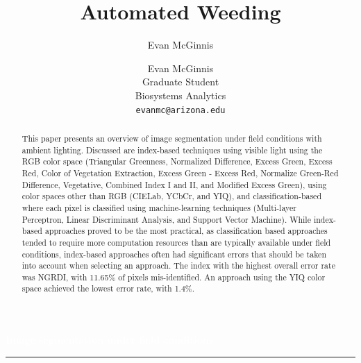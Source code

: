 \documentclass[letterpaper]{article}
\author{Evan McGinnis}
\title{Automated Weeding}
\author{%
    Evan McGinnis \\
    Graduate Student \\
    Biosystems Analytics \\
    \texttt{evanmc@arizona.edu}\vspace{40pt} \\
    }
\makeatletter
\def\printauthor{%
    {\large \@author}}
\makeatother
\begin{document}
\begin{titlepage}
\BgThispage
{}
\vspace*{1cm}
\noindent
\textcolor{white}{\Huge\textbf{\textsf{Image segmentation under field conditions}}}
\vspace*{3.5cm}\par
\noindent
\begin{minipage}{0.35\linewidth}
    \begin{flushright}
        \printauthor
    \end{flushright}
\end{minipage} \hspace{15pt}
%
\begin{minipage}{0.02\linewidth}
    \rule{1pt}{175pt}
\end{minipage} \hspace{-10pt}
%
\begin{minipage}{0.70\linewidth}
\vspace{5pt}
    \begin{abstract} 
This paper presents an overview of image segmentation under field conditions with ambient lighting. Discussed are index-based techniques using visible light using the RGB color space (Triangular Greenness, Normalized Difference, Excess Green, Excess Red, Color of Vegetation Extraction, Excess Green - Excess Red, Normalize Green-Red Difference, Vegetative, Combined Index I and II, and Modified Excess Green), using color spaces other than RGB (CIELab, YCbCr, and YIQ), and classification-based where each pixel is classified using machine-learning techniques (Multi-layer Perceptron, Linear Discriminant Analysis, and Support Vector Machine). While index-based approaches proved to be the most practical, as classification based approaches tended to require more computation resources than are typically available under field conditions, index-based approaches often had significant errors that should be taken into account when selecting an approach. The index with the highest overall error rate was NGRDI, with 11.65\% of pixels mis-identified. An approach using the YIQ color space achieved the lowest error rate, with 1.4\%.
    \end{abstract}
\end{minipage}
\end{titlepage}
\restoregeometry
%
%
\tableofcontents
\listoffigures
\listoftables
\newpage
\end{document}
